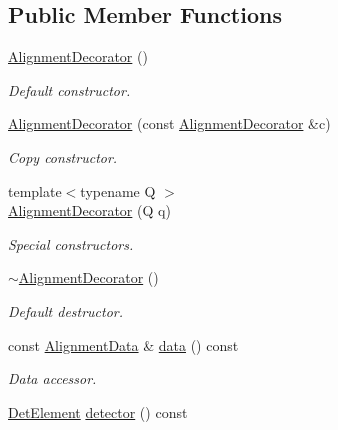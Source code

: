 \subsection*{Public Member Functions}
\begin{DoxyCompactItemize}
\item 
\hyperlink{class_d_d4hep_1_1_alignments_1_1_alignment_decorator_af15dc8788db4b9f8ffdaa366b88bd85b}{Alignment\+Decorator} ()
\begin{DoxyCompactList}\small\item\em Default constructor. \end{DoxyCompactList}\item 
\hyperlink{class_d_d4hep_1_1_alignments_1_1_alignment_decorator_ae0098f576f3cfd3f2356a2fef9af3245}{Alignment\+Decorator} (const \hyperlink{class_d_d4hep_1_1_alignments_1_1_alignment_decorator}{Alignment\+Decorator} \&c)
\begin{DoxyCompactList}\small\item\em Copy constructor. \end{DoxyCompactList}\item 
{\footnotesize template$<$typename Q $>$ }\\\hyperlink{class_d_d4hep_1_1_alignments_1_1_alignment_decorator_a86f6ab1abd1e65cd38b26e3c7ac75d67}{Alignment\+Decorator} (Q q)
\begin{DoxyCompactList}\small\item\em Special constructors. \end{DoxyCompactList}\item 
\hyperlink{class_d_d4hep_1_1_alignments_1_1_alignment_decorator_a4073c296e3287d0cbdb102b4d0f9f7ba}{$\sim$\+Alignment\+Decorator} ()
\begin{DoxyCompactList}\small\item\em Default destructor. \end{DoxyCompactList}\item 
const \hyperlink{class_d_d4hep_1_1_alignments_1_1_alignment_data}{Alignment\+Data} \& \hyperlink{class_d_d4hep_1_1_alignments_1_1_alignment_decorator_a33d5e92830f520adbbcfecafb45dc126}{data} () const
\begin{DoxyCompactList}\small\item\em Data accessor. \end{DoxyCompactList}\item 
\hyperlink{class_d_d4hep_1_1_geometry_1_1_det_element}{Det\+Element} \hyperlink{class_d_d4hep_1_1_alignments_1_1_alignment_decorator_a4b987fb41e5abb24edc602be61050a06}{detector} () const

\end{DoxyCompactItemize}
